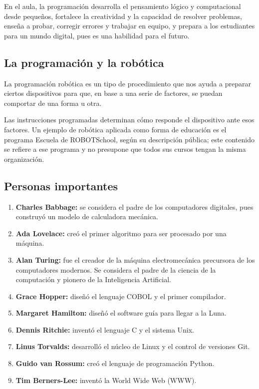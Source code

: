 \documentclass[12pt,letterpaper]{article}
\begin{document}
En el aula, la programación desarrolla el pensamiento lógico y computacional desde pequeños, fortalece la creatividad y la capacidad de resolver problemas, enseña a probar, corregir errores y trabajar en equipo, y prepara a los estudiantes para un mundo digital, pues es una habilidad para el futuro.

\subsection{La programación y la robótica}
La programación robótica es un tipo de procedimiento que nos ayuda a preparar ciertos dispositivos para que, en base a una serie de factores, se puedan comportar de una forma u otra.

Las instrucciones programadas determinan cómo responde el dispositivo ante esos factores. Un ejemplo de robótica aplicada como forma de educación es el programa Escuela de ROBOTSchool, según su descripción pública; este contenido se refiere a ese programa y no presupone que todos sus cursos tengan la misma organización.

\subsection{Personas importantes}
\begin{enumerate}[leftmargin=1.27cm,itemsep=0pt]
  \item \textbf{Charles Babbage:} se considera el padre de los computadores digitales, pues construyó un modelo de calculadora mecánica.
  \item \textbf{Ada Lovelace:} creó el primer algoritmo para ser procesado por una máquina.
  \item \textbf{Alan Turing:} fue el creador de la máquina electromecánica precursora de los computadores modernos. Se considera el padre de la ciencia de la computación y pionero de la Inteligencia Artificial.
  \item \textbf{Grace Hopper:} diseñó el lenguaje COBOL y el primer compilador.
  \item \textbf{Margaret Hamilton:} diseñó el software guía para llegar a la Luna.
  \item \textbf{Dennis Ritchie:} inventó el lenguaje C y el sistema Unix.
  \item \textbf{Linus Torvalds:} desarrolló el núcleo de Linux y el control de versiones Git.
  \item \textbf{Guido van Rossum:} creó el lenguaje de programación Python.
  \item \textbf{Tim Berners-Lee:} inventó la World Wide Web (WWW).
\end{enumerate}
\end{document}
